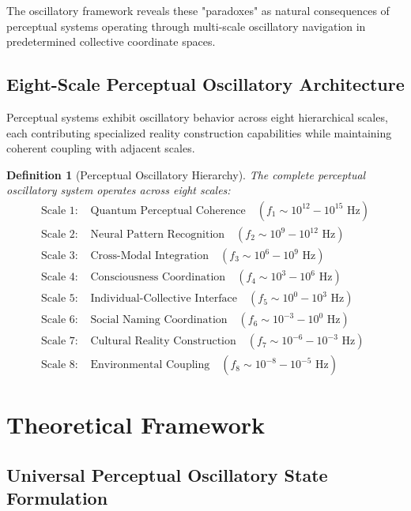 \documentclass[12pt,a4paper]{article}
\newtheorem{definition}{Definition}
\begin{document}
The oscillatory framework reveals these "paradoxes" as natural consequences of perceptual systems operating through multi-scale oscillatory navigation in predetermined collective coordinate spaces.

\subsection{Eight-Scale Perceptual Oscillatory Architecture}

Perceptual systems exhibit oscillatory behavior across eight hierarchical scales, each contributing specialized reality construction capabilities while maintaining coherent coupling with adjacent scales.

\begin{definition}[Perceptual Oscillatory Hierarchy]
The complete perceptual oscillatory system operates across eight scales:
\begin{align}
\text{Scale 1: } &\text{Quantum Perceptual Coherence} \quad (f_1 \sim 10^{12}-10^{15} \text{ Hz}) \\
\text{Scale 2: } &\text{Neural Pattern Recognition} \quad (f_2 \sim 10^9-10^{12} \text{ Hz}) \\
\text{Scale 3: } &\text{Cross-Modal Integration} \quad (f_3 \sim 10^6-10^9 \text{ Hz}) \\
\text{Scale 4: } &\text{Consciousness Coordination} \quad (f_4 \sim 10^3-10^6 \text{ Hz}) \\
\text{Scale 5: } &\text{Individual-Collective Interface} \quad (f_5 \sim 10^0-10^3 \text{ Hz}) \\
\text{Scale 6: } &\text{Social Naming Coordination} \quad (f_6 \sim 10^{-3}-10^0 \text{ Hz}) \\
\text{Scale 7: } &\text{Cultural Reality Construction} \quad (f_7 \sim 10^{-6}-10^{-3} \text{ Hz}) \\
\text{Scale 8: } &\text{Environmental Coupling} \quad (f_8 \sim 10^{-8}-10^{-5} \text{ Hz})
\end{align}
\end{definition}

\section{Theoretical Framework}

\subsection{Universal Perceptual Oscillatory State Formulation}
\end{document}
